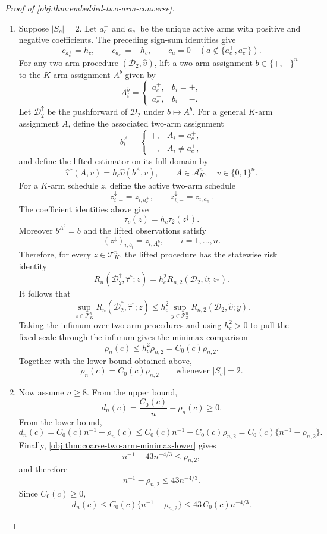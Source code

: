 \documentclass[11pt]{article}
\begin{document}
\begin{proof}[Proof of \cref{obj:thm:embedded-two-arm-converse}]
\begin{enumerate}
\item Suppose \(|S_c|=2\). Let \(a_c^+\) and \(a_c^-\) be the unique active arms with positive and negative coefficients. The preceding sign-sum identities give
\[
c_{a_c^+}=h_c,\qquad c_{a_c^-}=-h_c,
\qquad c_a=0\quad(a\notin\{a_c^+,a_c^-\}).
\]
For any two-arm procedure \((\mathcal D_2,\widehat\upsilon)\), lift a two-arm assignment \(b\in\{+,-\}^n\) to the \(K\)-arm assignment \(A^b\) given by
\[
A^b_i=
\begin{cases}
a_c^+,&b_i=+,\\
a_c^-,&b_i=-.
\end{cases}
\]
Let \(\mathcal D_2^\uparrow\) be the pushforward of \(\mathcal D_2\) under \(b\mapsto A^b\). For a general \(K\)-arm assignment \(A\), define the associated two-arm assignment
\[
b^A_i=
\begin{cases}
+,&A_i=a_c^+,\\
-,&A_i\ne a_c^+,
\end{cases}
\]
and define the lifted estimator on its full domain by
\[
\widehat\tau^\uparrow(A,v)=h_c\widehat\upsilon(b^A,v),
\qquad A\in\mathcal A_K^n,
\quad v\in\{0,1\}^n.
\]
For a \(K\)-arm schedule \(z\), define the active two-arm schedule
\[
z^\downarrow_{i,+}=z_{i,a_c^+},
\qquad
z^\downarrow_{i,-}=z_{i,a_c^-}.
\]
The coefficient identities above give
\[
\tau_c(z)=h_c\tau_2(z^\downarrow).
\]
Moreover \(b^{A^b}=b\) and the lifted observations satisfy
\[
(z^\downarrow)_{i,b_i}=z_{i,A^b_i},
\qquad i=1,\ldots,n.
\]
Therefore, for every \(z\in\mathcal T_K^n\), the lifted procedure has the statewise risk identity
\[
R_n(\mathcal D_2^\uparrow,\widehat\tau^\uparrow;z)
=
h_c^2 R_{n,2}(\mathcal D_2,\widehat\upsilon;z^\downarrow).
\]
It follows that
\[
\sup_{z\in\mathcal T_K^n}R_n(\mathcal D_2^\uparrow,\widehat\tau^\uparrow;z)
\le
h_c^2\sup_{y\in\mathcal T_2^n}R_{n,2}(\mathcal D_2,\widehat\upsilon;y).
\]
Taking the infimum over two-arm procedures and using \(h_c^2>0\) to pull the fixed scale through the infimum gives the minimax comparison
\[
\rho_n(c)
\le
h_c^2\rho_{n,2}
=
C_0(c)\rho_{n,2}.
\]
Together with the lower bound obtained above,
\[
\rho_n(c)=C_0(c)\rho_{n,2}
\qquad\text{whenever } |S_c|=2.
\]

\item Now assume \(n\ge8\). From the upper bound,
\[
d_n(c)=\frac{C_0(c)}{n}-\rho_n(c)\ge0.
\]
From the lower bound,
\[
d_n(c)
=
C_0(c)n^{-1}-\rho_n(c)
\le
C_0(c)n^{-1}-C_0(c)\rho_{n,2}
=
C_0(c)\{n^{-1}-\rho_{n,2}\}.
\]
Finally, \cref{obj:thm:coarse-two-arm-minimax-lower} gives
\[
n^{-1}-43n^{-4/3}\le \rho_{n,2},
\]
and therefore
\[
n^{-1}-\rho_{n,2}\le 43n^{-4/3}.
\]
Since \(C_0(c)\ge0\),
\[
d_n(c)
\le
C_0(c)\{n^{-1}-\rho_{n,2}\}
\le
43\,C_0(c)n^{-4/3}.
\]


\end{enumerate}
\end{proof}
\end{document}
